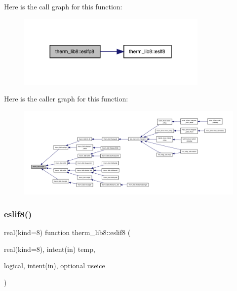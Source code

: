 Here is the call graph for this function\+:
\nopagebreak
\begin{figure}[H]
\begin{center}
\leavevmode
\includegraphics[width=264pt]{namespacetherm__lib8_a3f44aca95e1fb010823bb94ede3d19ca_cgraph}
\end{center}
\end{figure}
Here is the caller graph for this function\+:
\nopagebreak
\begin{figure}[H]
\begin{center}
\leavevmode
\includegraphics[width=350pt]{namespacetherm__lib8_a3f44aca95e1fb010823bb94ede3d19ca_icgraph}
\end{center}
\end{figure}
\mbox{\label{namespacetherm__lib8_a1b4385a0130e311cf955294b6ae00f7a}} 
\subsubsection{\texorpdfstring{eslif8()}{eslif8()}}
{\footnotesize\ttfamily real(kind=8) function therm\+\_\+lib8\+::eslif8 (\begin{DoxyParamCaption}\item[{real(kind=8), intent(in)}]{temp,  }\item[{logical, intent(in), optional}]{useice }\end{DoxyParamCaption})}

